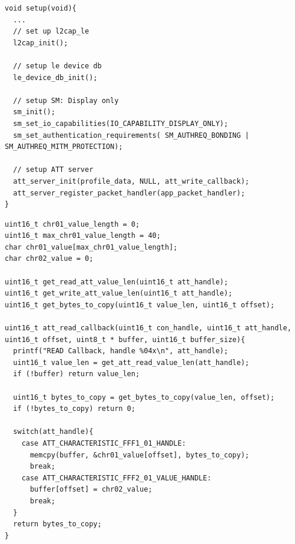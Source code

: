 \documentclass[a4paper,titlepage,oneside,12pt]{amsart} %
\begin{document}
\begin{lstlisting}[float, caption= Setting up LE peripheral., label=code:lePeripheralSetup]
void setup(void){
  ...
  // set up l2cap_le
  l2cap_init();
    
  // setup le device db
  le_device_db_init();

  // setup SM: Display only
  sm_init();
  sm_set_io_capabilities(IO_CAPABILITY_DISPLAY_ONLY);
  sm_set_authentication_requirements( SM_AUTHREQ_BONDING | SM_AUTHREQ_MITM_PROTECTION); 

  // setup ATT server
  att_server_init(profile_data, NULL, att_write_callback);  
  att_server_register_packet_handler(app_packet_handler);
}
\end{lstlisting}


\begin{lstlisting}[float, caption= Read callback ., label=code:lePeripheralReadCallback]
uint16_t chr01_value_length = 0;
uint16_t max_chr01_value_length = 40;
char chr01_value[max_chr01_value_length];
char chr02_value = 0;

uint16_t get_read_att_value_len(uint16_t att_handle);
uint16_t get_write_att_value_len(uint16_t att_handle);
uint16_t get_bytes_to_copy(uint16_t value_len, uint16_t offset);

uint16_t att_read_callback(uint16_t con_handle, uint16_t att_handle, uint16_t offset, uint8_t * buffer, uint16_t buffer_size){
  printf("READ Callback, handle %04x\n", att_handle);
  uint16_t value_len = get_att_read_value_len(att_handle);
  if (!buffer) return value_len;
      
  uint16_t bytes_to_copy = get_bytes_to_copy(value_len, offset);
  if (!bytes_to_copy) return 0;
  
  switch(att_handle){
    case ATT_CHARACTERISTIC_FFF1_01_HANDLE:
      memcpy(buffer, &chr01_value[offset], bytes_to_copy);
      break;
    case ATT_CHARACTERISTIC_FFF2_01_VALUE_HANDLE:
      buffer[offset] = chr02_value;
      break;
  }
  return bytes_to_copy;
}
\end{lstlisting}
\end{document}
